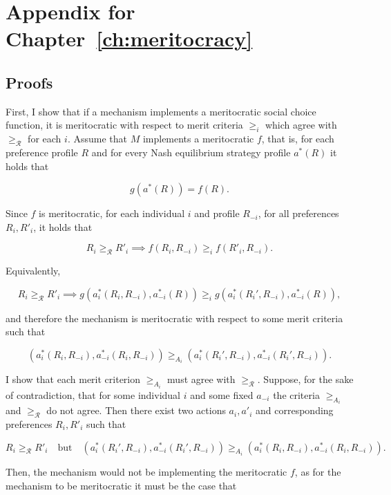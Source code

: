 \chapter{Appendix for Chapter \ref{ch:meritocracy}}
\label{app:meritocracy}

\section{Proofs}\label{sec:proofsmeritocracy}

\begin{implproof}
	First, I show that if a mechanism implements a meritocratic social choice function, it is meritocratic with respect to merit criteria \( \geq_i \) which agree with \( \geq_{\mathcal{R}} \) for each \( i \). Assume that \( M \) implements a meritocratic \( f \), that is, for each preference profile \( R \) and for every Nash equilibrium strategy profile \( a^{*} ( R ) \) it holds that

	\[
		g ( a^{*} ( R ) ) = f ( R ).
	\]

	Since \( f \) is meritocratic, for each individual \( i \) and profile \( R_{-i} \), for all preferences \( R_i, R'_i \), it holds that

	\[
		R_i \geq_{\mathcal{R}} R'_i \implies f (R_i, R_{-i}) \geq_i f (R'_i, R_{-i} ).
	\]

	Equivalently,

	\[
		R_i \geq_{\mathcal{R}} R'_i \implies g ( a_i^*(R_i, R_{-i}), a_{-i}^*(R) ) \geq_i g ( a_i^*(R_i', R_{-i}), a_{-i}^*(R) ),
	\]

	and therefore the mechanism is meritocratic with respect to some merit criteria such that

	\[ ( a_i^*(R_i, R_{-i}), a_{-i}^*(R_i, R_{-i}) ) \geq_{A_i} ( a_i^*(R_i', R_{-i}), a_{-i}^*(R_i', R_{-i}) ) .\]

	I show that each merit criterion \( \geq_{A_i} \) must agree with \( \geq_{\mathcal{R}} \). Suppose, for the sake of contradiction, that for some individual \( i \) and some fixed \( a_{-i} \) the criteria \( \geq_{A_i} \) and \( \geq_{\mathcal{R}} \) do not agree. Then there exist two actions \( a_i, a'_i \) and corresponding preferences \( R_i, R'_i \) such that

	\[
		R_i \geq_{\mathcal{R}} R'_i
		\quad \text{but} \quad
		( a_i^*(R_i', R_{-i}), a_{-i}^*(R_i', R_{-i}) ) \geq_{A_i} ( a_i^*(R_i, R_{-i}), a_{-i}^*(R_i, R_{-i}) ) .
	\]

	Then, the mechanism would not be implementing the meritocratic \( f \), as for the mechanism to be meritocratic it must be the case that


\end{implproof}
